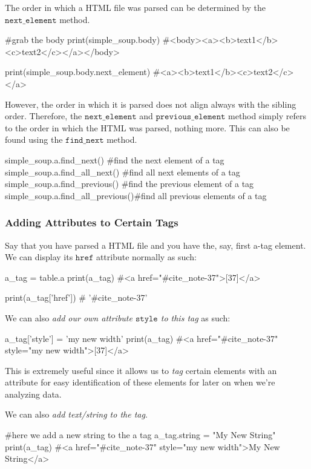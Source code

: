 \documentclass{article}
\begin{document}
  \begin{definition}
  The order in which a HTML file was parsed can be determined by the $\texttt{next\_element}$ method. 
  \begin{python}
  #grab the body
  print(simple_soup.body) 
  #<body><a><b>text1</b><c>text2</c></a></body>

  print(simple_soup.body.next_element)
  #<a><b>text1</b><c>text2</c></a>
  \end{python}

  However, the order in which it is parsed does not align always with the sibling order. Therefore, the $\texttt{next\_element}$ and $\texttt{previous\_element}$ method simply refers to the order in which the HTML was parsed, nothing more. This can also be found using the $\texttt{find\_next}$ method. 
  \begin{python}
  simple_soup.a.find_next()        #find the next element of a tag
  simple_soup.a.find_all_next()    #find all next elements of a tag
  simple_soup.a.find_previous()    #find the previous element of a tag
  simple_soup.a.find_all_previous()#find all previous elements of a tag
  \end{python}
  \end{definition}

  \subsubsection{Adding Attributes to Certain Tags}
  Say that you have parsed a HTML file and you have the, say, first a-tag element. We can display its $\texttt{href}$ attribute normally as such: 
  \begin{python}
  a_tag = table.a 
  print(a_tag) 
  #<a href="#cite_note-37">[37]</a>

  print(a_tag['href'])
  # '#cite_note-37'
  \end{python}
  We can also \textit{add our own attribute $\texttt{style}$ to this tag} as such: 
  \begin{python}
  a_tag['style'] = 'my new width'
  print(a_tag)
  #<a href="#cite_note-37" style="my new width">[37]</a>
  \end{python}

  This is extremely useful since it allows us to \textit{tag} certain elements with an attribute for easy identification of these elements for later on when we're analyzing data. 

  We can also \textit{add text/string to the tag}. 
  \begin{python}
  #here we add a new string to the a tag
  a_tag.string = "My New String"
  print(a_tag) 
  #<a href="#cite_note-37" style="my new width">My New String</a>
  \end{python}
\end{document}
